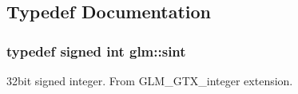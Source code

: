 \subsection{Typedef Documentation}
\hypertarget{group__gtx__integer_ga73643e09d8c6d362418aec541fdb987d}{
\subsubsection[{sint}]{\setlength{\rightskip}{0pt plus 5cm}typedef signed int {\bf glm\-::sint}}}\label{group__gtx__integer_ga73643e09d8c6d362418aec541fdb987d}
32bit signed integer. From G\-L\-M\-\_\-\-G\-T\-X\-\_\-integer extension. 

